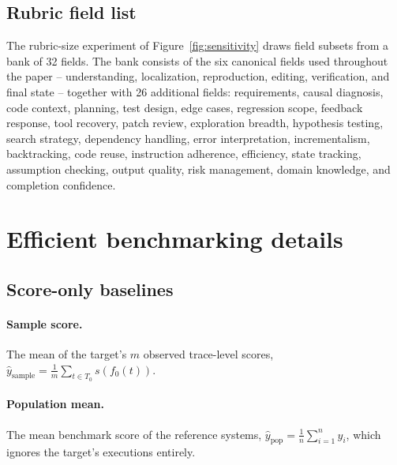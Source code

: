 \documentclass{article}
\begin{document}
\subsection{Rubric field list}
\label{app:fields}

The rubric-size experiment of Figure~\ref{fig:sensitivity} draws field subsets from a bank of 32 fields.
The bank consists of the six canonical fields used throughout the paper -- understanding, localization, reproduction, editing, verification, and final state -- together with 26 additional fields: requirements, causal diagnosis, code context, planning, test design, edge cases, regression scope, feedback response, tool recovery, patch review, exploration breadth, hypothesis testing, search strategy, dependency handling, error interpretation, incrementalism, backtracking, code reuse, instruction adherence, efficiency, state tracking, assumption checking, output quality, risk management, domain knowledge, and completion confidence.

\section{Efficient benchmarking details}
\label{app:baselines}

\subsection{Score-only baselines}
\label{app:score-baselines}

\paragraph{Sample score.} The mean of the target's $m$ observed trace-level scores, $\hat{y}_{\mathrm{sample}} = \frac{1}{m} \sum_{t \in T_{0}} s(f_{0}(t))$.

\paragraph{Population mean.} The mean benchmark score of the reference systems, $\hat{y}_{\mathrm{pop}} = \frac{1}{n} \sum_{i=1}^{n} y_{i}$, which ignores the target's executions entirely.
\end{document}
